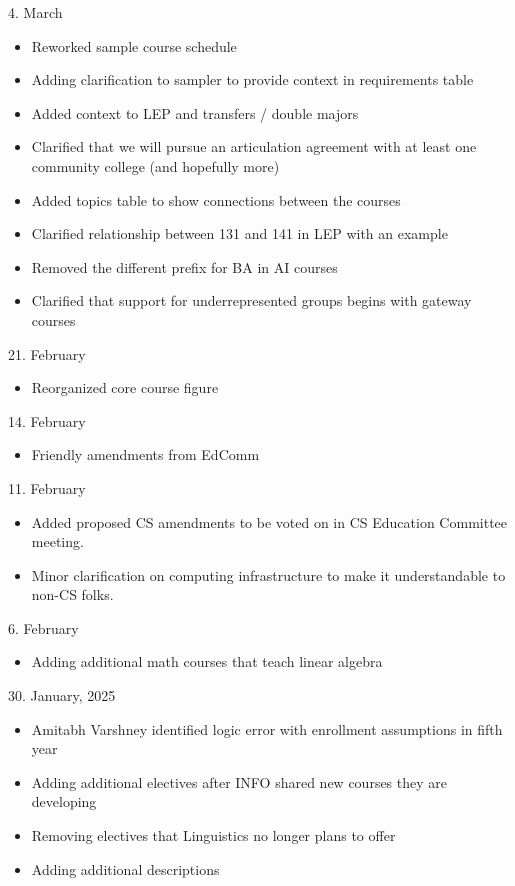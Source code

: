 
4. March

\begin{itemize}
      \item Reworked sample course schedule
  \item Adding clarification to sampler to provide context in
    requirements table
  \item Added context to LEP and transfers / double majors
    \item Clarified that we will pursue an articulation agreement with
      at least one community college (and hopefully more)
    \item Added topics table to show connections between the courses
      \item Clarified relationship between 131 and 141 in LEP with an
        example
      \item Removed the different prefix for BA in AI courses
        \item Clarified that support for underrepresented groups
          begins with gateway courses
\end{itemize}

21. February

\begin{itemize}
  \item Reorganized core course figure
\end{itemize}

14. February

\begin{itemize}
    \item Friendly amendments from EdComm
\end{itemize}

11. February

\begin{itemize}
    \item Added proposed CS amendments to be voted on in CS Education Committee meeting.
    \item Minor clarification on computing infrastructure to make it understandable to non-CS folks.
\end{itemize}

6. February
\begin{itemize}
  \item Adding additional math courses that teach linear algebra
\end{itemize}

30. January, 2025
\begin{itemize}
  \item Amitabh Varshney identified logic error with enrollment assumptions in fifth year
  \item Adding additional electives after INFO shared new courses they are developing
  \item Removing electives that Linguistics no longer plans to offer 
  \item Adding additional descriptions
\end{itemize}


